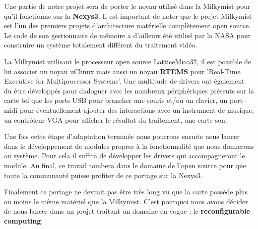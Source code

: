 Une partie de notre projet sera de porter le noyau utilisé dans la Milkymist
pour qu'il fonctionne sur la {\bf Nexys3}. Il est important de noter que le
projet Milkymist est l'un des premiers projets d'architecture matérielle
complètement open source. Le code de son gestionnaire de mémoire a d'ailleurs
été utilisé par la NASA pour construire un système totalement différent du
traitement vidéo.

La Milkymist utilisant le processeur open source LatticeMico32, il est possible
de lui associer un noyau uClinux mais aussi un noyau {\bf RTEMS} pour
'Real-Time Executive for Multiprocessor Systems'. Une multitude de drivers ont
également du être développés pour dialoguer avec les nombreux périphériques
présents sur la carte tel que les ports USB pour brancher une souris et/ou un
clavier, un port midi pour éventuellement ajouter des interactions avec un
instrument de musique, un contrôleur VGA pour afficher le résultat du
traitement, une carte son.

Une fois cette étape d'adaptation terminée nous pourrons ensuite nous lancer
dans le développement de modules propres à la fonctionnalité que nous donnerons
au système. Pour cela il suffira de développer les drivers qui accompagneront
le module. Au final, ce travail tombera dans le domaine de l'open source pour
que toute la communauté puisse profiter de ce portage sur la Nexys3.

Finalement ce portage ne devrait pas être très long vu que la carte possède
plus ou moins le même matériel que la Milkymist. C'est pourquoi nous avons
décider de nous lancer dans un projet traitant un domaine en vogue : le {\bf
reconfigurable computing}.

